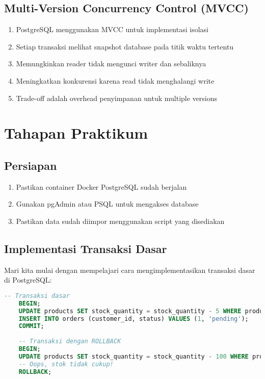 \subsection{Multi-Version Concurrency Control (MVCC)}
\begin{enumerate}
    \item PostgreSQL menggunakan MVCC untuk implementasi isolasi
    \item Setiap transaksi melihat snapshot database pada titik waktu tertentu
    \item Memungkinkan reader tidak mengunci writer dan sebaliknya
    \item Meningkatkan konkurensi karena read tidak menghalangi write
    \item Trade-off adalah overhead penyimpanan untuk multiple versions
\end{enumerate}

\section{Tahapan Praktikum}

\subsection{Persiapan}
\begin{enumerate}
	\item Pastikan container Docker PostgreSQL sudah berjalan
	\item Gunakan pgAdmin atau PSQL untuk mengakses database
	\item Pastikan data sudah diimpor menggunakan script yang disediakan
\end{enumerate}

\subsection{Implementasi Transaksi Dasar}
Mari kita mulai dengan mempelajari cara mengimplementasikan transaksi dasar di PostgreSQL:

\begin{lstlisting}[language=SQL]
	-- Transaksi dasar
	BEGIN;
	UPDATE products SET stock_quantity = stock_quantity - 5 WHERE product_id = 1;
	INSERT INTO orders (customer_id, status) VALUES (1, 'pending');
	COMMIT;
	
	-- Transaksi dengan ROLLBACK
	BEGIN;
	UPDATE products SET stock_quantity = stock_quantity - 100 WHERE product_id = 1;
	-- Oops, stok tidak cukup!
	ROLLBACK;
\end{lstlisting}

